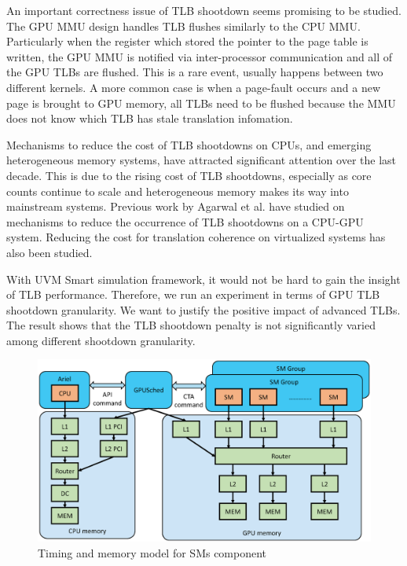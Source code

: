 An important correctness issue of TLB shootdown seems promising to be studied. The GPU MMU design handles TLB flushes similarly to the CPU MMU. Particularly when the register which stored the pointer to the page table is written, the GPU MMU is notified via inter-processor communication and all of the GPU TLBs are flushed. This is a rare event, usually happens between two different kernels. A more common case is when a page-fault occurs and a new page is brought to GPU memory, all TLBs need to be flushed because the MMU does not know which TLB has stale translation infomation.

Mechanisms to reduce the cost of TLB shootdowns on CPUs, and emerging heterogeneous memory systems, have attracted significant attention over the last decade. This is due to the rising cost of TLB shootdowns, especially as core counts continue to scale and heterogeneous memory makes its way into mainstream systems. Previous work by Agarwal et al. have studied on mechanisms to reduce the occurrence of TLB shootdowns on a CPU-GPU system. Reducing the cost for translation coherence on virtualized systems has also been studied.

With UVM Smart simulation framework, it would not be hard to gain the insight of TLB performance. Therefore, we run an experiment in terms of GPU TLB shootdown granularity. We want to justify the positive impact of advanced TLBs. The result shows that the TLB shootdown penalty is not significantly varied among different shootdown granularity.


   \begin{figure}[!htb]
      \centering
      \setlength{\abovecaptionskip}{6pt plus 1pt minus 1pt}
      \includegraphics[width=.90\textwidth,keepaspectratio]{figures/3_1.eps}
      \captionsetup{width=.75\textwidth}
      \caption{Timing and memory model for SMs component}
      \label{fig:gpu_mem_model}
   \end{figure}
